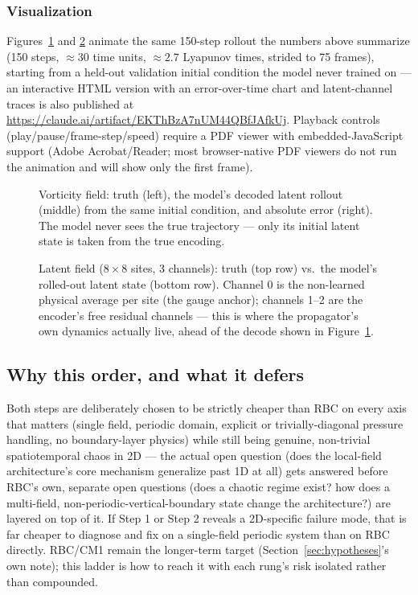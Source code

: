\documentclass[11pt]{article}
\begin{document}
\subsubsection{Visualization}
\label{sec:section231_viz}

Figures~\ref{fig:section231_physical} and \ref{fig:section231_latent}
animate the same 150-step rollout the numbers above summarize (150
steps, $\approx30$ time units, $\approx2.7$ Lyapunov times, strided to
75 frames), starting from a held-out validation initial condition the
model never trained on --- an interactive HTML version with an
error-over-time chart and latent-channel traces is also published at
\url{https://claude.ai/artifact/EKThBzA7nUM44QBfJAfkUj}. Playback
controls (play/pause/frame-step/speed) require a PDF viewer with
embedded-JavaScript support (Adobe Acrobat/Reader; most browser-native
PDF viewers do not run the animation and will show only the first
frame).

\begin{figure}[h]
\centering
{}
\caption{Vorticity field: truth (left), the model's decoded latent
rollout (middle) from the same initial condition, and absolute error
(right). The model never sees the true trajectory --- only its initial
latent state is taken from the true encoding.}
\label{fig:section231_physical}
\end{figure}

\begin{figure}[h]
\centering
{}
\caption{Latent field ($8\times8$ sites, 3 channels): truth (top row) vs.\
the model's rolled-out latent state (bottom row). Channel 0 is the
non-learned physical average per site (the gauge anchor); channels 1--2
are the encoder's free residual channels --- this is where the
propagator's own dynamics actually live, ahead of the decode shown in
Figure~\ref{fig:section231_physical}.}
\label{fig:section231_latent}
\end{figure}

\subsection{Why this order, and what it defers}

Both steps are deliberately chosen to be strictly cheaper than RBC on
every axis that matters (single field, periodic domain, explicit or
trivially-diagonal pressure handling, no boundary-layer physics) while
still being genuine, non-trivial spatiotemporal chaos in 2D --- the
actual open question (does the local-field architecture's core
mechanism generalize past 1D at all) gets answered before RBC's own,
separate open questions (does a chaotic regime exist? how does a
multi-field, non-periodic-vertical-boundary state change the
architecture?) are layered on top of it. If Step 1 or Step 2 reveals a
2D-specific failure mode, that is far cheaper to diagnose and fix on a
single-field periodic system than on RBC directly. RBC/CM1 remain the
longer-term target (Section~\ref{sec:hypotheses}'s own note); this
ladder is how to reach it with each rung's risk isolated rather than
compounded.
\end{document}
